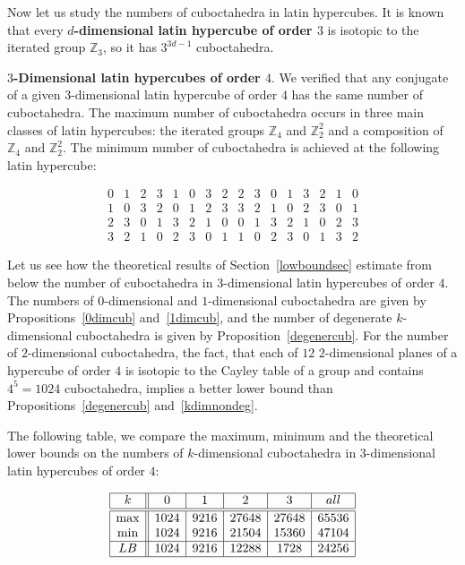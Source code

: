 \documentclass[a4paper]{article}
\begin{document}
Now let us study the numbers of cuboctahedra in latin hypercubes.
It is known that every \textbf{$d$-dimensional latin hypercube of order $3$} is isotopic to the iterated group $\mathbb{Z}_3$, so it has $3^{3d-1}$ cuboctahedra. 



\textbf{$3$-Dimensional latin hypercubes of order $4$}.
We verified that any conjugate of a  given $3$-dimensional latin hypercube of order $4$  has the same number of cuboctahedra.  The maximum number of cuboctahedra occurs in three main classes of latin hypercubes: the iterated groups $\mathbb{Z}_4$ and $\mathbb{Z}_2^2$ and  a composition of $\mathbb{Z}_4$ and $\mathbb{Z}_2^2$.  The minimum number of cuboctahedra is achieved at the following latin hypercube:


$$
\begin{array}{cccc|cccc|cccc|cccc}
0 & 1 & 2 & 3 &  1 & 0 & 3 & 2 &  2 & 3 & 0 & 1 &  3 & 2 & 1 & 0 \\ 
1 & 0 & 3 & 2 &  0 & 1 & 2 & 3 &  3 & 2 & 1 & 0 &  2 & 3 & 0 & 1 \\ 
2 & 3 & 0 & 1 &  3 & 2 & 1 & 0 &  0 & 1 & 3 & 2 &  1 & 0 & 2 & 3 \\
3 & 2 & 1 & 0 &  2 & 3 & 0 & 1 &  1 & 0 & 2 & 3 &  0 & 1 & 3 & 2
\end{array}
$$

Let us see how the theoretical results of  Section~\ref{lowboundsec}  estimate  from below the number of cuboctahedra in $3$-dimensional latin hypercubes of order $4$. The numbers of $0$-dimensional and $1$-dimensional cuboctahedra are given by Propositions~\ref{0dimcub} and~\ref{1dimcub}, and the number of degenerate $k$-dimensional cuboctahedra is given by Proposition~\ref{degenercub}.  For the number of $2$-dimensional cuboctahedra,  the fact, that each of $12$  $2$-dimensional planes of a hypercube of order $4$ is isotopic to the Cayley table of a group and contains $4^5 = 1024$ cuboctahedra, implies a better lower bound than Propositions~\ref{degenercub} and~\ref{kdimnondeg}. 


The following table, we  compare the maximum, minimum and the theoretical lower bounds on the numbers of $k$-dimensional cuboctahedra in $3$-dimensional latin hypercubes of order $4$:

$$
\begin{array}{|c||c|c|c|c|c|}
\hline
k & 0 & 1 & 2 & 3 & all \\
\hline
\hline
\max & 1024 & 9216 & 27648 & 27648 & 65536 \\
\min  & 1024 & 9216 & 21504 & 15360  & 47104\\
\hline
 LB & 1024 & 9216 & 12288 &  1728 & 24256 \\
 \hline
\end{array}
$$
\end{document}
